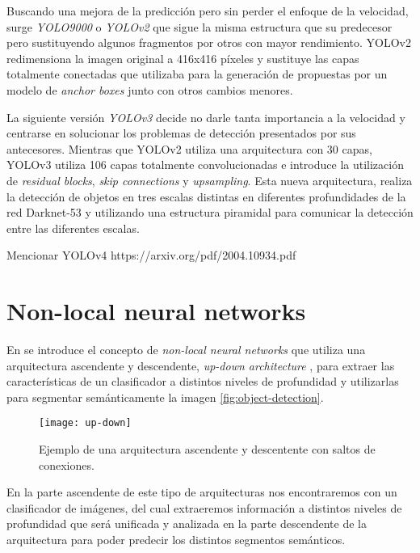 Buscando una mejora de la predicción pero sin perder el enfoque de la velocidad, surge \emph{YOLO9000} o \emph{YOLOv2} \cite{2016arXiv161208242R} que sigue la misma estructura que su predecesor pero sustituyendo algunos fragmentos por otros con mayor rendimiento. YOLOv2 redimensiona la imagen original a 416x416 píxeles y sustituye las capas totalmente conectadas que utilizaba para la generación de propuestas por un modelo de \emph{anchor boxes} \cite{2015arXiv150601497R} junto con otros cambios menores.\newline

La siguiente versión \emph{YOLOv3} \cite{2018arXiv180402767R} decide  no darle tanta importancia a la velocidad y centrarse en solucionar los problemas de detección presentados por sus antecesores. Mientras que YOLOv2 utiliza una arquitectura con 30 capas, YOLOv3 utiliza 106 capas totalmente convolucionadas e introduce la utilización de \emph{residual blocks}, \emph{skip connections} y \emph{upsampling}. Esta nueva arquitectura, realiza la detección de objetos en tres escalas distintas en diferentes profundidades de la red Darknet-53 y utilizando una estructura piramidal \cite{2016arXiv161203144L} para comunicar la detección entre las diferentes escalas.\newline

Mencionar YOLOv4
https://arxiv.org/pdf/2004.10934.pdf\newline

\section{Non-local neural networks}

En \cite{DBLP:journals/corr/abs-1711-07971} se introduce el concepto de \emph{non-local neural networks} que utiliza una arquitectura ascendente y descendente, \emph{up-down architecture} \cite{2016arXiv160308695P}, para extraer las características de un clasificador a distintos niveles de profundidad y utilizarlas para segmentar semánticamente la imagen \autoref{fig:object-detection}.\newline

\begin{figure}[htpb]
  \centering
  \texttt{[image: up-down]}
  \caption{Ejemplo de una arquitectura ascendente y descentente con saltos de conexiones\cite{2016arXiv160308695P}.}
  \label{fig:up-down}
\end{figure}


En la parte ascendente de este tipo de arquitecturas nos encontraremos con un clasificador de imágenes, del cual extraeremos información a distintos niveles de profundidad que será unificada y analizada en la parte descendente de la arquitectura para poder predecir los distintos segmentos semánticos. \\


